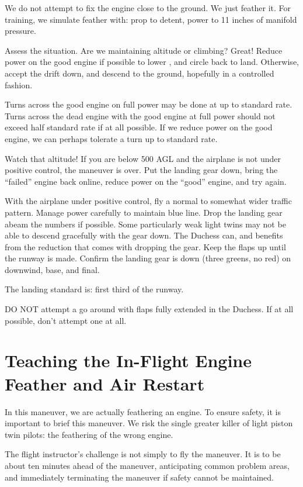 We do not attempt to fix the engine close to the ground. We just feather it. For training, we simulate feather with: prop to detent, power
to 11 inches of manifold pressure.

Assess the situation. Are we maintaining altitude or climbing? Great! Reduce power on the good engine if possible to lower \vmc,
and circle back to land. Otherwise, accept the drift down, and descend to the ground, hopefully in a controlled fashion.

Turns across the good engine on full power may be done at up to standard rate. Turns across the dead engine with the good
engine at full power should not exceed half standard rate if at all possible. If we reduce power on the good engine, we can
perhaps tolerate a turn up to standard rate.

Watch that altitude! If you are below 500 AGL and the airplane is not under positive control, the maneuver is over. Put the landing
gear down, bring the ``failed'' engine back online, reduce power on the ``good'' engine, and try again.

With the airplane under positive control, fly a normal to somewhat wider traffic pattern. Manage power carefully to maintain blue
line. Drop the landing gear abeam the numbers if possible. Some particularly weak light twins may not be able to descend gracefully
with the gear down. The Duchess can, and benefits from the \vmc reduction that comes with dropping the gear. Keep the flaps up until
the runway is made. Confirm the landing gear is down (three greens, no red) on downwind, base, and final.

The landing standard is: first third of the runway.

DO NOT attempt a go around with flaps fully extended in the Duchess. If at all possible, don't attempt one at all.

\section{Teaching the In-Flight Engine Feather and Air Restart}

In this maneuver, we are actually feathering an engine. To ensure safety, it is important to brief this maneuver. We risk the
single greater killer of light piston twin pilots: the feathering of the wrong engine.

The flight instructor's challenge is not simply to fly the maneuver. It is to be about ten minutes
ahead of the maneuver, anticipating common problem areas, and immediately terminating the
maneuver if safety cannot be maintained.

